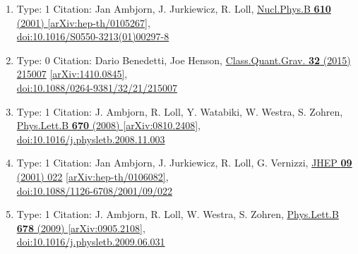 \documentclass[a4paper,10pt]{article}
\begin{document}
\begin{enumerate}
\begin{enumerate}
  \item Type: 1 Citation: Jan Ambjorn, J. Jurkiewicz, R. Loll, \href{https://www.doi.org/10.1016/S0550-3213(01)00297-8}{Nucl.Phys.B {\bf 610} (2001) }  \href{https://arxiv.org/abs/hep-th/0105267}{[arXiv:hep-th/0105267]},\\\href{https://www.doi.org/10.1016/S0550-3213(01)00297-8}{doi:10.1016/S0550-3213(01)00297-8}
  \item Type: 0 Citation: Dario Benedetti, Joe Henson, \href{https://www.doi.org/10.1088/0264-9381/32/21/215007}{Class.Quant.Grav. {\bf 32} (2015) 215007}  \href{https://arxiv.org/abs/1410.0845}{[arXiv:1410.0845]},\\\href{https://www.doi.org/10.1088/0264-9381/32/21/215007}{doi:10.1088/0264-9381/32/21/215007}
  \item Type: 1 Citation: J. Ambjorn, R. Loll, Y. Watabiki, W. Westra, S. Zohren, \href{https://www.doi.org/10.1016/j.physletb.2008.11.003}{Phys.Lett.B {\bf 670} (2008) }  \href{https://arxiv.org/abs/0810.2408}{[arXiv:0810.2408]},\\\href{https://www.doi.org/10.1016/j.physletb.2008.11.003}{doi:10.1016/j.physletb.2008.11.003}
  \item Type: 1 Citation: Jan Ambjorn, J. Jurkiewicz, R. Loll, G. Vernizzi, \href{https://www.doi.org/10.1088/1126-6708/2001/09/022}{JHEP {\bf 09} (2001) 022}  \href{https://arxiv.org/abs/hep-th/0106082}{[arXiv:hep-th/0106082]},\\\href{https://www.doi.org/10.1088/1126-6708/2001/09/022}{doi:10.1088/1126-6708/2001/09/022}
  \item Type: 1 Citation: J. Ambjorn, R. Loll, W. Westra, S. Zohren, \href{https://www.doi.org/10.1016/j.physletb.2009.06.031}{Phys.Lett.B {\bf 678} (2009) }  \href{https://arxiv.org/abs/0905.2108}{[arXiv:0905.2108]},\\\href{https://www.doi.org/10.1016/j.physletb.2009.06.031}{doi:10.1016/j.physletb.2009.06.031}

\end{enumerate}
\end{enumerate}
\end{document}
